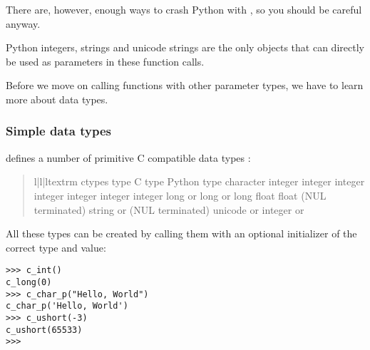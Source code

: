 There are, however, enough ways to crash Python with , so
you should be careful anyway.

Python integers, strings and unicode strings are the only objects that
can directly be used as parameters in these function calls.

Before we move on calling functions with other parameter types, we
have to learn more about  data types.


\subsubsection{Simple data types\label{ctypes-simple-data-types}}

 defines a number of primitive C compatible data types :
\begin{quote}
\begin{tableiii}{l|l|l}{textrm}
{
ctypes type
}
{
C type
}
{
Python type
}
{
}
{
character
}
{
}
{
integer
}
{
}
{
integer
}
{
}
{
integer
}
{
}
{
integer
}
{
}
{
integer
}
{
}
{
integer
}
{
}
{
integer
}
{
}
{
long
}
{
 or
}
{
long
}
{
 or
}
{
long
}
{
}
{
float
}
{
}
{
float
}
{
(NUL terminated)
}
{
string or
}
{
(NUL terminated)
}
{
unicode or
}
{
}
{
integer or
}
\end{tableiii}
\end{quote}

All these types can be created by calling them with an optional
initializer of the correct type and value:
\begin{verbatim}
>>> c_int()
c_long(0)
>>> c_char_p("Hello, World")
c_char_p('Hello, World')
>>> c_ushort(-3)
c_ushort(65533)
>>>
\end{verbatim}

